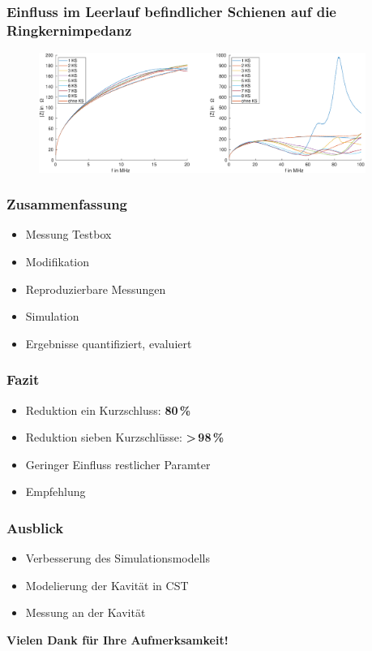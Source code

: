 \documentclass[accentcolor=tud9b, colorbacktitle, inverttitle]{tudbeamer}
\begin{document}
\begin{frame}\frametitle{Einfluss im Leerlauf befindlicher Schienen auf die Ringkernimpedanz}
\vspace{-1em}
\begin{figure}[h]
	\centering
	\includegraphics[width=0.95\textwidth]{Z_RK_numKS_open}
\end{figure}
\end{frame}

\begin{frame}\frametitle{Zusammenfassung}
\begin{itemize}
	\item Messung Testbox
	\item Modifikation 
	\item Reproduzierbare Messungen
	\item Simulation
	\item Ergebnisse quantifiziert, evaluiert
\end{itemize}
\end{frame}


\begin{frame}\frametitle{Fazit}
\begin{itemize}
	\item Reduktion ein Kurzschluss: \textbf{80\,\%}
	\item Reduktion sieben Kurzschl\"usse:  \textbf{>\,98\,\%}
	\item Geringer Einfluss restlicher Paramter
	\item Empfehlung
\end{itemize}
\end{frame}

\begin{frame}\frametitle{Ausblick}
\begin{itemize}
	\item Verbesserung des Simulationsmodells
	\item Modelierung der Kavit\"at in CST
	\item Messung an der Kavit\"at
\end{itemize}
\end{frame}

\begin{frame}
\vspace{2cm}\hspace{2cm}
{\Large\bf Vielen Dank für Ihre Aufmerksamkeit!}
\end{frame}
% 	 
\end{document}
